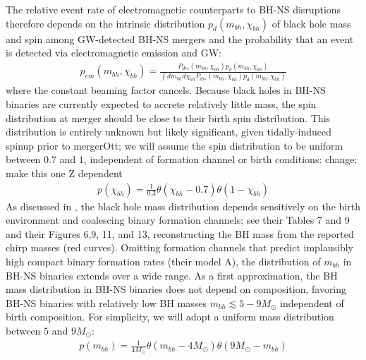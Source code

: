 \documentclass[nofootinbib,twocolumn,prd]{emulateapj}
\newcommand\editremark[1]{{\color{red}#1}}
\begin{document}
The relative event rate of electromagnetic counterparts to BH-NS disruptions therefore depends on the intrinsic
distribution $p_d(m_{bh},\chi_{bh})$ of black hole mass and spin among GW-detected BH-NS mergers and the probability
that an event is detected via electromagnetic emission and GW: 
\begin{eqnarray}
p_{em}(m_{bh},\chi_{bh}) = \frac{P_{dis}(m_{bh},\chi_{bh}) p_d(m_{bh},\chi_{bh})}{\int dm_{bh} d\chi_{bh}P_{dis}(m_{bh},\chi_{bh}) p_d(m_{bh},\chi_{bh})}
\end{eqnarray}
where the constant beaming factor cancels.  
%
Because black holes in BH-NS binaries are currently expected to accrete relatively little mass, the spin distribution at merger
should be close to their birth spin distribution.   This distribution is entirely unknown but likely significant, given
tidally-induced spinup prior to merger\editremark{Ott}; we will assume the spin distribution to be uniform between $0.7$
and $1$, independent of formation channel or birth conditions: \editremark{change: make this one Z dependent}
\begin{eqnarray}
p(\chi_{bh}) = \frac{1}{0.3} \theta(\chi_{bh}-0.7)\theta(1-\chi_{bh})
\end{eqnarray}
As discussed in \cite{popsyn-LowMetallicityImpact2-StarTrackRevised-2012},  the black hole mass distribution depends
sensitively on the birth environment and coalescing binary formation channels; see their Tables 7 and 9 and their Figures 6,9, 11, and 13,
reconstructing the BH mass from the reported chirp masses (red curves).  
Omitting formation channels that predict implausibly high compact binary formation rates (their model A), the
distribution of $m_{bh}$ in BH-NS binaries extends over a wide range.  As a first approximation, the BH mass
distribution in BH-NS binaries does not depend on composition, favoring BH-NS binaries with relatively low BH masses
$m_{bh}\lesssim 5-9 M_\odot$ independent of birth composition.  
For simplicity, we will adopt a uniform mass distribution between $5$ and $9 M_\odot$:
\begin{eqnarray}
p(m_{bh}) = \frac{1}{4 M_\odot} \theta(m_{bh}-4 M_\odot)\theta(9 M_\odot-m_{bh})
\end{eqnarray}


\end{document}
